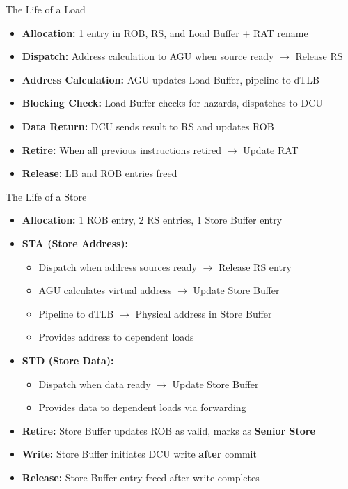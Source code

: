 \documentclass[aspectratio=169,12pt]{beamer}
\begin{document}
\begin{frame}{The Life of a Load}
\begin{itemize}
    \item \textbf{Allocation:} 1 entry in ROB, RS, and Load Buffer + RAT rename
    \item \textbf{Dispatch:} Address calculation to AGU when source ready $\rightarrow$ Release RS
    \item \textbf{Address Calculation:} AGU updates Load Buffer, pipeline to dTLB
    \item \textbf{Blocking Check:} Load Buffer checks for hazards, dispatches to DCU
    \item \textbf{Data Return:} DCU sends result to RS and updates ROB
    \item \textbf{Retire:} When all previous instructions retired $\rightarrow$ Update RAT
    \item \textbf{Release:} LB and ROB entries freed
\end{itemize}
\end{frame}

\begin{frame}{The Life of a Store}
\begin{itemize}
    \item \textbf{Allocation:} 1 ROB entry, 2 RS entries, 1 Store Buffer entry
    \item \textbf{STA (Store Address):}
    \begin{itemize}
        \item Dispatch when address sources ready $\rightarrow$ Release RS entry
        \item AGU calculates virtual address $\rightarrow$ Update Store Buffer
        \item Pipeline to dTLB $\rightarrow$ Physical address in Store Buffer
        \item Provides address to dependent loads
    \end{itemize}
    \item \textbf{STD (Store Data):}
    \begin{itemize}
        \item Dispatch when data ready $\rightarrow$ Update Store Buffer
        \item Provides data to dependent loads via forwarding
    \end{itemize}
    \item \textbf{Retire:} Store Buffer updates ROB as valid, marks as \textbf{Senior Store}
    \item \textbf{Write:} Store Buffer initiates DCU write \textbf{after} commit
    \item \textbf{Release:} Store Buffer entry freed after write completes
\end{itemize}
\end{frame}
\end{document}
